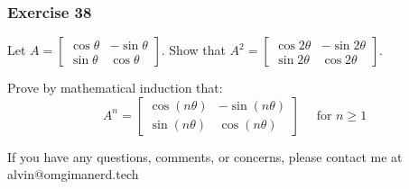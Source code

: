 \documentclass[letterpaper, 12pt]{math}
\begin{document}
\subsubsection*{Exercise 38}
Let \( A = \begin{bmatrix}\cos\theta & -\sin\theta \\ \sin\theta & \cos\theta
\end{bmatrix} \). Show that \( A^2 = \begin{bmatrix}\cos2\theta & -\sin2\theta
\\ \sin2\theta & \cos2\theta\end{bmatrix} \).

Prove by mathematical induction that:
\[ A^n = \begin{bmatrix}
  \cos(n\theta) & -\sin(n\theta) \\
  \sin(n\theta) & \cos(n\theta)
\end{bmatrix} \quad \text{ for } n\ge 1 \]

\begin{center}
  If you have any questions, comments, or concerns, please contact me at
  alvin@omgimanerd.tech
\end{center}
\end{document}
